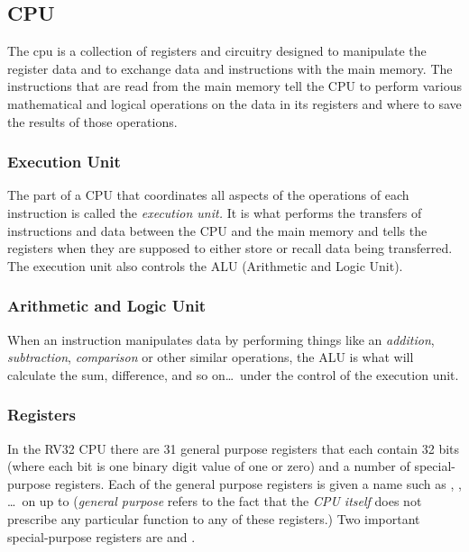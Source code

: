 \subsection{CPU}

The \acrshort{cpu} is a collection of registers and circuitry designed to
manipulate the register data and to exchange data and instructions with the
main memory.  The instructions that are read from the main memory tell
the CPU to perform various mathematical and logical operations on the data
in its registers and where to save the results of those operations.

\subsubsection{Execution Unit}

The part of a CPU that coordinates all aspects of the operations of each
instruction is called the {\em execution unit.}  It is what performs the transfers
of instructions and data between the CPU and the main memory and tells the
registers when they are supposed to either store or recall data being transferred.
The execution unit also controls the ALU (Arithmetic and Logic Unit).

\subsubsection{Arithmetic and Logic Unit}

When an instruction manipulates data by performing things like an {\em addition},
{\em subtraction}, {\em comparison} or other similar operations, the ALU is what
will calculate the sum, difference, and so on\ldots\ under the control of the
execution unit.



\subsubsection{Registers}

In the RV32 CPU there are 31 general purpose registers that each contain 32 \gls{bit}s
(where each bit is one \gls{binary} digit value of one or zero) and a number
of special-purpose registers.
Each of the general purpose registers is given a name such as , ,
\ldots\ on up to  ({\em general purpose} refers to the fact that the
{\em CPU itself} does not prescribe any particular function to any of these registers.)
Two important special-purpose registers are  and .

